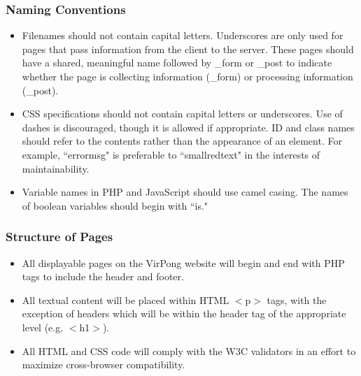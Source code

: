 		\subsubsection{Naming Conventions}
		\begin{itemize}
			\item Filenames should not contain capital letters. Underscores are only used for pages that pass information from the client to the server. These pages should have a shared, meaningful name followed by \_form or \_post to indicate whether the page is collecting information (\_form) or processing information (\_post).
			\item CSS specifications should not contain capital letters or underscores. Use of dashes is discouraged, though it is allowed if appropriate. ID and class names should refer to the contents rather than the appearance of an element. For example, ``errormsg" is preferable to ``smallredtext" in the interests of maintainability.
			\item Variable names in PHP and JavaScript should use camel casing. The names of boolean variables should begin with ``is."
		\end{itemize}
			
		\subsubsection{Structure of Pages}
		\begin{itemize}
			\item All displayable pages on the VirPong website will begin and end with PHP tags to include the header and footer.
			\item All textual content will be placed within HTML $<$p$>$ tags, with the exception of headers which will be within the header tag of the appropriate level (e.g. $<$h1$>$).
			\item All HTML and CSS code will comply with the W3C validators in an effort to maximize cross-browser compatibility.
		\end{itemize}
			
